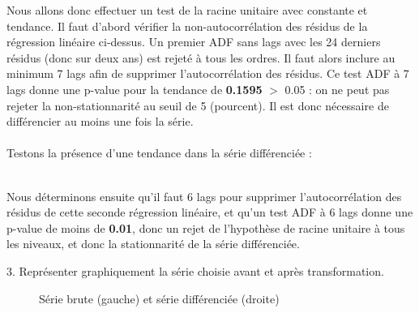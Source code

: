 \documentclass[a4paper, 12pt]{article} %
\begin{document}
{\normalsize
{Nous allons donc effectuer un test de la racine unitaire avec constante et tendance. Il faut d'abord vérifier la non-autocorrélation des résidus de la régression linéaire ci-dessus. Un premier ADF sans lags avec les 24 derniers résidus (donc sur deux ans) est rejeté à tous les ordres. Il faut alors inclure au minimum 7 lags afin de supprimer l'autocorrélation des résidus. \newline Ce test ADF à 7 lags donne une p-value pour la tendance de \textbf{0.1595} $>$ 0.05 : on ne peut pas rejeter la non-stationnarité au seuil de 5 (pourcent). Il est donc nécessaire de différencier au moins une fois la série.}}
\\ \\{\normalsize
{Testons la présence d'une tendance dans la série différenciée :}}
\begin{table}[h]
    \centering
    \caption{Régression linéaire de l'indice différencié sur la date}
\end{table}
{\normalsize
{\\Nous déterminons ensuite qu'il faut 6 lags pour supprimer l'autocorrélation des résidus de cette seconde régression linéaire, et qu'un test ADF à 6 lags donne une p-value de moins de \textbf{0.01}, donc un rejet de l'hypothèse de racine unitaire à tous les niveaux, et donc la stationnarité de la série différenciée.}}
\begin{tcolorbox}
{\small
3. Représenter graphiquement la série choisie avant et après transformation.
}
\end{tcolorbox}
\begin{figure}[h]
    \centering
    \caption{Série brute (gauche) et série différenciée (droite)}
\end{figure}
\end{document}

